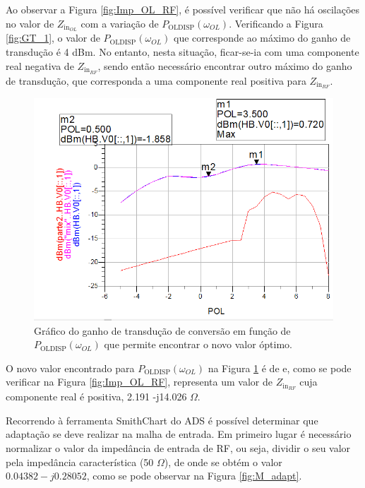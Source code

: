 \documentclass[11pt]{article}
\numberwithin{equation}{section}
\begin{document}
Ao observar a Figura \ref{fig:Imp_OL_RF}, é possível verificar que não há oscilações no valor de $ Z_{\text{in}_{OL}} $ com a variação de $ P_{\text{OLDISP}}\left(\omega_{OL}\right) $. Verificando a Figura \ref{fig:GT_1}, o valor de $ P_{\text{OLDISP}}\left(\omega_{OL}\right) $ que corresponde ao máximo do ganho de transdução é 4 dBm. No entanto, nesta situação, ficar-se-ia com uma componente real negativa de $ Z_{\text{in}_{RF}} $, sendo então necessário encontrar outro máximo do ganho de transdução, que corresponda a uma componente real positiva para  $ Z_{\text{in}_{RF}} $.

\begin{figure}[h]
\centering
\includegraphics[keepaspectratio=true, scale=0.45]{exps/GT_20}
\vspace{-0.5em}
\caption{Gráfico do ganho de transdução de conversão em função de $ P_{\text{OLDISP}}\left(\omega_{OL}\right) $ que permite encontrar o novo valor óptimo.}
\vspace{-0.8em}
\label{fig:GT_20}
\end{figure}

O novo valor encontrado para $ P_{\text{OLDISP}}\left(\omega_{OL}\right) $ na Figura \ref{fig:GT_20} é de  e, como se pode verificar na Figura \ref{fig:Imp_OL_RF}, representa um valor de $ Z_{\text{in}_{RF}} $ cuja componente real é positiva, 2.191 -j14.026 $\Omega $.

Recorrendo à ferramenta SmithChart do ADS é possível determinar que adaptação se deve realizar na malha de entrada. Em primeiro lugar é necessário normalizar o valor da impedância de entrada de RF, ou seja, dividir o seu valor pela impedância característica (50 $\Omega$), de onde se obtém o valor $0.04382 -j0.28052$, como se pode observar na Figura \ref{fig:M_adapt}.
\end{document}
